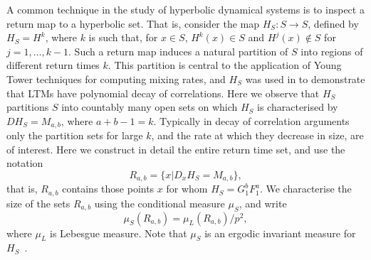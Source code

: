 \documentclass{iopart}
\begin{document}
A common technique in the study of hyperbolic dynamical systems is to inspect a return map to a hyperbolic set. That is, consider the map $H_S: S \to S$, defined by $H_S = H^k$, where $k$ is such that, for $x \in S$, $H^k(x) \in S$ and $H^j(x) \notin S$ for $j=1, \ldots , k-1$. Such a return map induces a natural partition of $S$ into regions of different return times $k$. This partition is central to the application of Young Tower techniques for computing mixing rates, and $H_S$ was used in \cite{springham2014polynomial} to demonstrate that LTMs have polynomial decay of correlations. Here we observe that $H_S$ partitions $S$ into countably many 
open sets on which $H_S$ is characterised by $DH_S = M_{a,b}$, where $a+b-1 = k$. Typically in decay of correlation arguments only the partition sets for large $k$, and the rate at which they decrease in size, are of interest. Here we construct in detail the entire return time set, and use the notation
$$
R_{a,b} = \{ x | D_x H_S = M_{a,b} \},
$$
that is, $R_{a,b}$ contains those points $x$ for whom $H_S = G_1^b F_1^a$. We characterise the size of the sets $R_{a,b}$ using the conditional measure $\mu_S$, and write
$$
\mu_S(R_{a,b}) = \mu_L(R_{a,b})/p^2,
$$
where $\mu_L$ is Lebesgue measure. Note that $\mu_S$ is an ergodic invariant measure for $H_S$~\cite{przytycki1983ergodicity}. 
\end{document}
